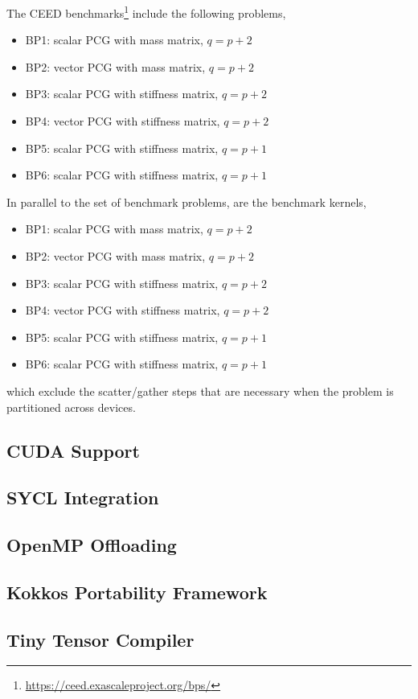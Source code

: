 \documentclass[a4paper,12pt]{article}
\begin{document}
The CEED benchmarks\footnote{\url{https://ceed.exascaleproject.org/bps/}} include the following problems,
\begin{itemize}
    \item BP1: scalar PCG with mass matrix, $q = p+2$
    \item BP2: vector PCG with mass matrix, $q = p+2$
    \item BP3: scalar PCG with stiffness matrix, $q = p+2$
    \item BP4: vector PCG with stiffness matrix, $q = p+2$
    \item BP5: scalar PCG with stiffness matrix, $q = p+1$
    \item BP6: scalar PCG with stiffness matrix, $q = p+1$
\end{itemize}
In parallel to the set of benchmark problems, are the benchmark kernels,
\begin{itemize}
    \item BP1: scalar PCG with mass matrix, $q = p+2$
    \item BP2: vector PCG with mass matrix, $q = p+2$
    \item BP3: scalar PCG with stiffness matrix, $q = p+2$
    \item BP4: vector PCG with stiffness matrix, $q = p+2$
    \item BP5: scalar PCG with stiffness matrix, $q = p+1$
    \item BP6: scalar PCG with stiffness matrix, $q = p+1$
\end{itemize}
which exclude the scatter/gather steps that are necessary when 
the problem is partitioned across devices.

\subsection{CUDA Support}
\subsection{SYCL Integration}
\subsection{OpenMP Offloading}
\subsection{Kokkos Portability Framework}
\subsection{Tiny Tensor Compiler}
\end{document}
